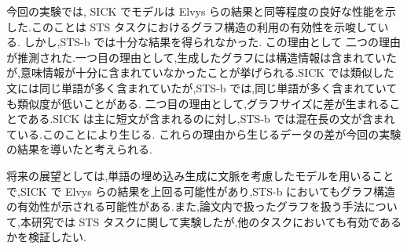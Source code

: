 \documentclass{abst}
\begin{document}
{\par 今回の実験では, SICK でモデルは Elvys らの結果と同等程度の良好な性能を示した.このことは STS タスクにおけるグラフ構造の利用の有効性を示唆している.
しかし,STS-b では十分な結果を得られなかった.
この理由として 二つの理由が推測された.一つ目の理由として,生成したグラフには構造情報は含まれていたが,意味情報が十分に含まれていなかったことが挙げられる.SICK では類似した文には同じ単語が多く含まれていたが,STS-b では,同じ単語が多く含まれていても類似度が低いことがある.
二つ目の理由として,グラフサイズに差が生まれることである.SICK は主に短文が含まれるのに対し,STS-b では混在長の文が含まれている.このことにより生じる.
これらの理由から生じるデータの差が今回の実験の結果を導いたと考えられる.
\par 将来の展望としては,単語の埋め込み生成に文脈を考慮したモデルを用いることで,SICK で Elvys らの結果を上回る可能性があり,STS-b においてもグラフ構造の有効性が示される可能性がある.また,論文内で扱ったグラフを扱う手法について,本研究では STS タスクに関して実験したが,他のタスクにおいても有効であるかを検証したい.
}
\end{document}
